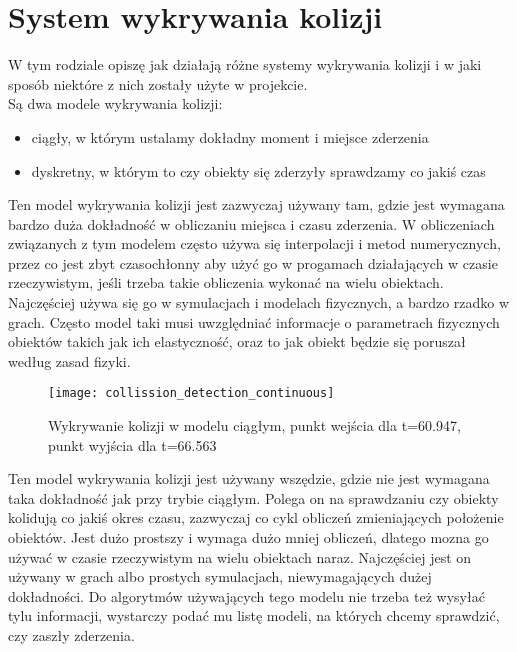 \chapter{System wykrywania kolizji}
\thispagestyle{chapterBeginStyle}
\label{chapter_collission_detection}

W tym rodziale opiszę jak działają różne systemy wykrywania kolizji i w jaki sposób niektóre z nich zostały użyte w projekcie.\\

\noindent Są dwa modele wykrywania kolizji:
\begin{itemize}[topsep=0.2em, itemsep=0.5em, partopsep=0em, parsep=0em]
	\item ciągły, w którym ustalamy dokładny moment i miejsce zderzenia
	\item dyskretny, w którym to czy obiekty się zderzyły sprawdzamy co jaki\'s czas
\end{itemize}\bigskip


Ten model wykrywania kolizji jest zazwyczaj używany tam, gdzie jest wymagana bardzo duża dokładno\'sć w obliczaniu miejsca i czasu zderzenia. W obliczeniach związanych z tym modelem często używa się interpolacji i metod numerycznych, przez co jest zbyt czasochłonny aby użyć go w progamach działających w czasie rzeczywistym, je\'sli trzeba takie obliczenia wykonać na wielu obiektach. Najczę\'sciej używa się go w symulacjach i modelach fizycznych, a bardzo rzadko w grach. Często model taki musi uwzględniać informacje o parametrach fizycznych obiektów takich jak ich elastyczno\'sć, oraz to jak obiekt będzie się poruszał według zasad fizyki.\\

\begin{figure}[h]
	\centering
	\noindent\texttt{[image: collission\_detection\_continuous]}
	\caption{Wykrywanie kolizji w modelu ciągłym, punkt wej\'scia dla t=60.947, punkt wyj\'scia dla t=66.563}
\end{figure}
\newpage
{}

Ten model wykrywania kolizji jest używany wszędzie, gdzie nie jest wymagana taka dokładno\'sć jak przy trybie ciągłym. Polega on na sprawdzaniu czy obiekty kolidują co jaki\'s okres czasu, zazwyczaj co cykl obliczeń zmieniających położenie obiektów. Jest dużo prostszy i wymaga dużo mniej obliczeń, dlatego mozna go używać w czasie rzeczywistym na wielu obiektach naraz. Najczę\'sciej jest on używany w grach albo prostych symulacjach, niewymagających dużej dokładno\'sci. Do algorytmów używających tego modelu nie trzeba też wysyłać tylu informacji, wystarczy podać mu listę modeli, na których chcemy sprawdzić, czy zaszły zderzenia.\\

